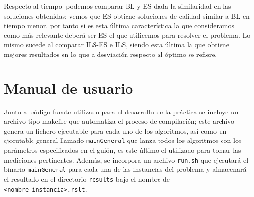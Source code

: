\documentclass[11pt,a4paper]{article}
\begin{document}
	\noindent Respecto al tiempo, podemos comparar BL y ES dada la similaridad en las soluciones obtenidas; vemos que ES obtiene soluciones de calidad similar a BL en tiempo menor, por tanto si es esta última característica la que consideramos como más relevante deberá ser ES el que utilicemos para resolver el problema. Lo mismo sucede al comparar ILS-ES e ILS, siendo esta última la que obtiene mejores resultados en lo que a desviación respecto al óptimo se refiere.
	
	\FloatBarrier
	\clearpage
	
\section{Manual de usuario}

	\noindent Junto al código fuente utilizado para el desarrollo de la práctica se incluye un archivo tipo makefile que automatiza el proceso de compilación; este archivo genera un fichero ejecutable para cada uno de los algoritmos, así como un ejecutable general llamado \texttt{mainGeneral} que lanza todos los algoritmos con los parámetros especificados en el guión, es este último el utilizado para tomar las mediciones pertinentes. Además, se incorpora un archivo \texttt{run.sh} que ejecutará el binario \texttt{mainGeneral} para cada una de las instancias del problema y almacenará el resultado en el directorio \texttt{results} bajo el nombre de \texttt{<nombre\_instancia>.rslt}.
	
\end{document}
